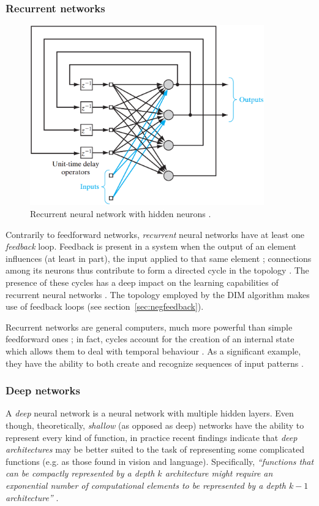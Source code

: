 \documentclass[11pt,a4paper]{report}
\newcommand{\quot}[1]{``#1''}
\begin{document}
				\subsubsection{Recurrent networks}
				\begin{figure}[t]
					\centering
					\includegraphics[width=0.9\textwidth]{recurrent}
					\caption{Recurrent neural network with hidden neurons \cite{haykin2009neural}.}
					\label{fig:recurrent}
				\end{figure}
				Contrarily to feedforward networks, \emph{recurrent} neural networks have at least one \emph{feedback} loop. Feedback is present in a system when the output of an element influences (at least in part), the input applied to that same element \cite{haykin2009neural}; connections among its neurons thus contribute to form a directed cycle in the topology \cite{yu2015recurrent}. The presence of these cycles has a deep impact on the learning capabilities of recurrent neural networks \cite{haykin2009neural}. The topology employed by the DIM algorithm makes use of feedback loops (see section~\ref{sec:negfeedback}).
				
				Recurrent networks are general computers, much more powerful than simple feedforward ones \cite{schmidhuber2015deep}; in fact, cycles account for the creation of an internal state which allows them to deal with temporal behaviour \cite{yu2015recurrent}. As a significant example, they have the ability to both create and recognize sequences of input patterns \cite{cleeremans1993mechanisms,pearlmutter1990dynamic}.
				
				\subsubsection{Deep networks}
				A \emph{deep} neural network is a neural network with multiple hidden layers. Even though, theoretically, \emph{shallow} (as opposed as deep) networks have the ability to represent every kind of function, in practice recent findings indicate that \emph{deep architectures} may be better suited to the task of representing some complicated functions (e.g. as those found in vision and language). Specifically, \emph{\quot{functions that can be compactly represented by a depth $k$ architecture might require an exponential number of computational elements to be represented by a depth $k - 1$ architecture}} \cite{bengio2009learning}.
			
\end{document}
